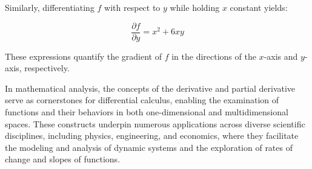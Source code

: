 \documentclass{article}
\begin{document}
Similarly, differentiating $f$ with respect to $y$ while holding $x$ constant yields:

$$
\frac{\partial f}{\partial y} = x^2 + 6xy
$$

These expressions quantify the gradient of $f$ in the directions of the $x$-axis and $y$-axis,
respectively.

In mathematical analysis, the concepts of the derivative and partial derivative serve as cornerstones
for differential calculus, enabling the examination of functions and their behaviors in both 
one-dimensional and multidimensional spaces. These constructs underpin numerous applications across 
diverse scientific disciplines, including physics, engineering, and economics, where they facilitate
the modeling and analysis of dynamic systems and the exploration of rates of change and slopes of 
functions.
\end{document}
